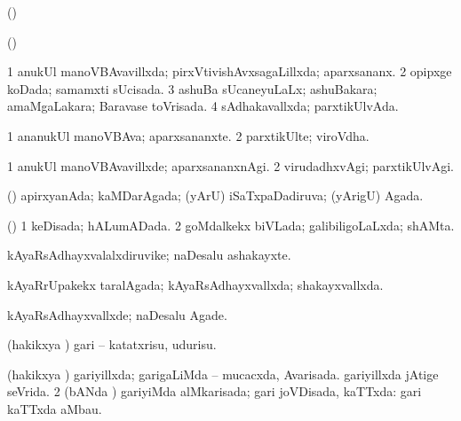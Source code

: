 {\bentry
{} 
\gl{\gu}
\expl{}
\bmng
 (\ame)  
\emng
\eentry

\bentry
{} 
\gl{\gu}
\expl{}
\bmng
 (\ame)  
\emng
\eentry

\bentry
{} 
\gl{\gu}
\expl{}
\bmng
\bnum
\num{1} anukUl manoVBAvavillxda; pirxVtivishAvxsagaLillxda; aparxsananx. 
\num{2} opipxge koDada; samamxti sUcisada. 
\num{3} ashuBa sUcaneyuLaLx; ashuBakara; amaMgaLakara; Baravase toVrisada. 
\num{4} sAdhakavallxda; parxtikUlvAda. 
\enum
\emng
\eentry

\bentry
{} 
\gl{\nA}
\expl{}
\bmng
\bnum
\num{1} ananukUl manoVBAva; aparxsananxte. 
\num{2} parxtikUlte; viroVdha. 
\enum
\emng
\eentry

\bentry
{} 
\gl{\kirxvi}
\expl{}
\bmng
\bnum
\num{1} anukUl manoVBAvavillxde; aparxsananxnAgi. 
\num{2} virudadhxvAgi; parxtikUlvAgi. 
\enum
\emng
\eentry

\bentry
{} 
\gl{\gu}
\expl{}
\bmng
 (\AmA) apirxyanAda; kaMDarAgada; (yArU) iSaTxpaDadiruva; (yArigU) Agada. 
\emng
\eentry

\bentry
{} 
\gl{\gu}
\expl{}
\bmng
(\AmA) 
\bnum
\num{1} keDisada; hALumADada. 
\num{2} goMdalkekx biVLada; galibiligoLaLxda; shAMta. 
\enum
\emng
\eentry

\bentry
{} 
\gl{\nA}
\expl{}
\bmng
kAyaRsAdhayxvalalxdiruvike; naDesalu ashakayxte. 
\emng
\eentry

\bentry
{} 
\gl{\gu}
\expl{}
\bmng
 kAyaRrUpakekx taralAgada; kAyaRsAdhayxvallxda; shakayxvallxda. 
\emng
\eentry

\bentry
{} 
\gl{\kirxvi}
\expl{}
\bmng
 kAyaRsAdhayxvallxde; naDesalu Agade. 
\emng
\eentry

\bentry
{} 
\gl{\sakirx}
\expl{}
\bmng
 (hakikxya \vi) gari -- katatxrisu, udurisu. 
\emng
\eentry

\bentry
{} 
\gl{\gu}
\expl{}
\bmng
\bnum
{} (hakikxya \vi) 
\banum
{} gariyillxda; garigaLiMda -- mucacxda, Avarisada. 
 gariyillxda jAtige seVrida. 
\eanum
\numie
\num{2} (bANda \vi) gariyiMda alMkarisada; gari joVDisada, kaTTxda:  gari kaTTxda aMbau. 
\enum
\emng
\eentry

}
